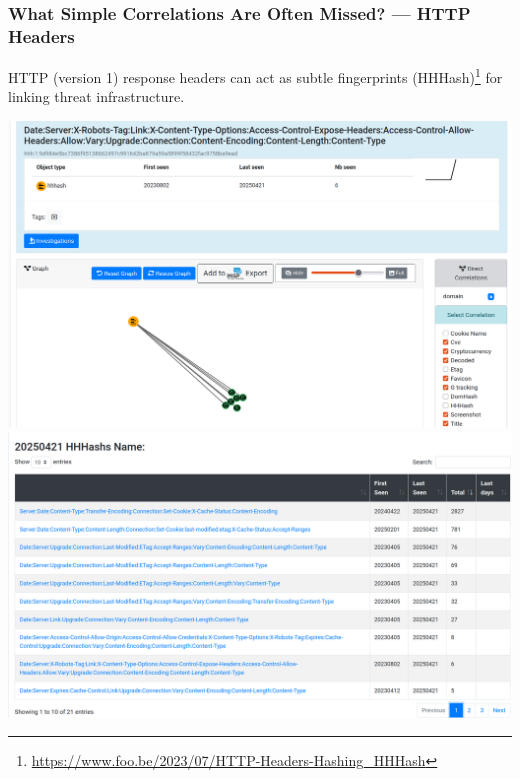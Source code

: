\documentclass[10pt,aspectratio=169, colorlinks=true, linkcolor=circlBlue]{beamer}
\begin{document}
\begin{frame}
    \frametitle{What Simple Correlations Are Often Missed? — HTTP Headers}
    \begin{center}
	    HTTP (version 1) response headers can act as subtle fingerprints (HHHash)\footnote{\url{https://www.foo.be/2023/07/HTTP-Headers-Hashing_HHHash}} for linking threat infrastructure.
        \vspace{1em}

        \includegraphics[scale=0.11]{./img/hhh.png}
        \hspace{0.5em}
        \includegraphics[scale=0.11]{./img/hhh2.png}
    \end{center}
\end{frame}
\end{document}
